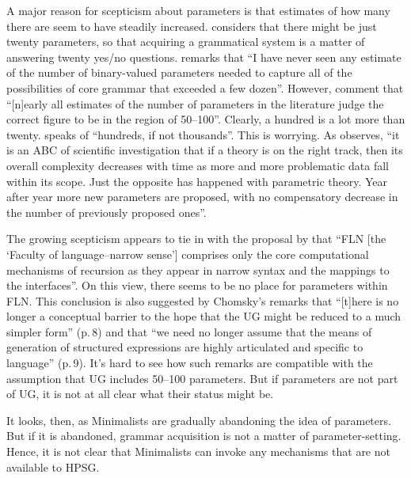 \documentclass[output=paper,biblatex,babelshorthands,newtxmath,draftmode,colorlinks,citecolor=brown]{langscibook}
\begin{document}
A major reason for scepticism about parameters is that estimates of how many there are seem to have
steadily increased. \citet[]{Fodor2001b} considers that there might be just twenty parameters, so that
acquiring a grammatical system is a matter of answering twenty yes/no questions. \citet[]{Newmeyer2005a} remarks that ``I have never seen any estimate of the number of binary-valued
parameters needed to capture all of the possibilities of core grammar that exceeded a few
dozen''. However, \citet{RH2005a} comment that ``[n]early all estimates of the number of
parameters in the literature judge the correct figure to be in the region of 50--100''. Clearly, a
hundred is a lot more than twenty. \citet[Section~6.3]{Newmeyer2017a} speaks of ``hundreds, if not thousands''.
This is worrying. As \citet[]{Newmeyer2006a-u} observes, ``it
is an ABC of scientific investigation that if a theory is on the right track, then its overall
complexity decreases with time as more and more problematic data fall within its scope. Just the
opposite has happened with parametric theory. Year after year more new parameters are proposed, with
no compensatory decrease in the number of previously proposed ones''.

The growing scepticism appears to tie in with the proposal by \citet*[]{HCF2002a}
that ``FLN [the `Faculty of language--narrow sense'] comprises only the core computational mechanisms of
recursion as they appear in narrow syntax and the mappings to the interfaces''. On this view, there
seems to be no place for parameters within FLN. This conclusion is also suggested by Chomsky’s
remarks \citeyearpar{Chomsky2005a} that ``[t]here is no longer a conceptual barrier to the hope that the UG
might be reduced to a much simpler form'' (p.\,8) and that ``we need no longer assume that
the means of generation of structured expressions are highly articulated and specific to language''
(p.\,9). It’s hard to see how such remarks are compatible with the assumption that UG includes 50--100
parameters. But if parameters are not part of UG, it is not at all clear what their status might be.

It looks, then, as Minimalists are gradually abandoning the idea of parameters. But if it is
abandoned, grammar acquisition is not a matter of parameter-setting. Hence, it is not clear that
Minimalists can invoke any mechanisms that are not available to HPSG.
\end{document}
